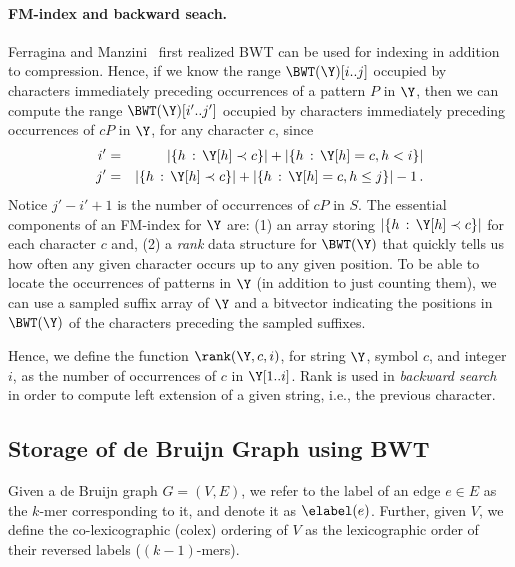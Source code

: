 \paragraph*{FM-index and backward seach.}  Ferragina and Manzini~\cite{fm2005} first  realized BWT can be used for indexing in addition to compression.   Hence, if we know the range \(\BWT (\Y) [i..j]\) occupied by characters immediately preceding occurrences of a pattern $P$ in $\Y$, then we can compute the range \(\BWT (\Y) [i'..j']\) occupied by characters immediately preceding occurrences of \(c P\) in $\Y$, for any character $c$, since
\begin{eqnarray*}
i' & = & |\{h\,:\,\Y [h] \prec c\}| + |\{h\,:\,\Y [h] = c, h < i\}| \\
j' & =  & |\{h\,:\,\Y [h] \prec c\}| + |\{h\,:\, \Y [h] = c, h \leq j\}| - 1\,.
\end{eqnarray*}
Notice \(j' - i' + 1\) is the number of occurrences of \(c P\) in $S$.  The essential components of an FM-index for $\Y$ are: (1) an array storing \(|\{h\,:\,\Y [h] \prec c\}|\) for each character $c$ and, (2) a {\em rank} data structure for \(\BWT (\Y)\) that quickly tells us how often any given character occurs up to any given position. To be able to locate the occurrences of patterns in $\Y$ (in addition to just counting them), we can use a sampled suffix array of $\Y$ and a bitvector indicating the positions in \(\BWT (\Y)\) of the characters preceding the sampled suffixes.  

Hence, we define the function
$\rank(\Y, c,i)$, for string $\Y$, symbol $c$, and integer $i$, as 
the number of occurrences of $c$ in $\Y[1..i]$. Rank is used in {\em backward search}~\cite{fm2005} in order to compute left extension of a given string, i.e., the previous character. 



\subsection*{Storage of de Bruijn Graph using BWT} 

Given a de Bruijn graph $G =(V, E)$, we refer to the label of an edge $e \in E$ as the $k$-mer corresponding to it, and denote it as $\elabel(e)$.  Further, given $V$, we define the co-lexicographic (colex) ordering of $V$ as the lexicographic order of their reversed labels ($(k - 1)$-mers).  

